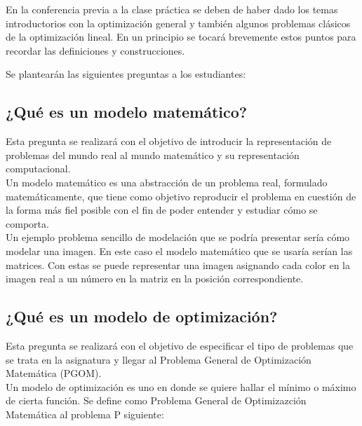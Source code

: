 \documentclass[a4paper,10pt,twocolumn]{article}
\theoremstyle{theorem}
\theoremstyle{definition}
\theoremstyle{remark}
\begin{document}
En la conferencia previa a la clase práctica se deben de haber dado los temas introductorios con la optimización general y también algunos problemas clásicos de la optimización lineal. En un principio se tocará brevemente estos puntos para recordar las definiciones y construcciones.

Se plantearán las siguientes preguntas a los estudiantes:

	\subsection{¿Qué es un modelo matemático?}\label{sub:results}

Esta pregunta se realizará con el objetivo de introducir la representación de problemas del mundo real al mundo matemático y su representación computacional.\\

Un modelo matemático es una abstracción de un problema real, formulado matemáticamente, que tiene como objetivo reproducir el problema en cuestión de la forma más fiel posible con el fin de poder entender y estudiar cómo se comporta.\\

Un ejemplo problema sencillo de modelación que se podría presentar sería cómo modelar una imagen. En este caso el modelo matemático que se usaría serían las matrices. Con estas se puede representar una imagen asignando cada color en la imagen real a un número en la matriz en la posición correspondiente. 

	\subsection{¿Qué es un modelo de optimización?}\label{sub:results}

Esta pregunta se realizará con el objetivo de especificar el tipo de problemas que se trata en la asignatura y llegar al Problema General de Optimización Matemática (PGOM).\\

Un modelo de optimización es uno en donde se quiere hallar el mínimo o máximo de cierta función. Se define como Problema General de Optimizazción Matemática al problema P siguiente:
\end{document}
